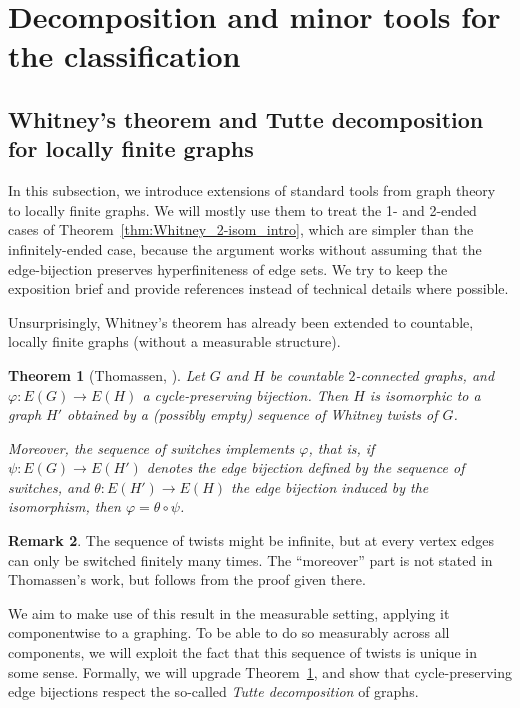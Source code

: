\documentclass{article}
\theoremstyle{plain}
\newtheorem{thm}{Theorem}[section]
\theoremstyle{definition}
\newtheorem{rem}[thm]{Remark}
\begin{document}
\section{Decomposition and minor tools for the classification} \label{sec:assembling_tools}

\subsection{Whitney's theorem and Tutte decomposition for locally finite graphs} \label{subsec:locally_finite_tools}

In this subsection, we introduce extensions of standard tools from graph theory to locally finite graphs. We will mostly use them to treat the 1- and 2-ended cases of Theorem~\ref{thm:Whitney_2-isom_intro}, which are simpler than the infinitely-ended case, because the argument works without assuming that the edge-bijection preserves hyperfiniteness of edge sets. We try to keep the exposition brief and provide references instead of technical details where possible.

Unsurprisingly, Whitney's theorem has already been extended to countable, locally finite graphs (without a measurable structure).

\begin{thm}[Thomassen, {\cite[Theorem 4.1]{thomassen1982duality}}] \label{thm:thomassen}
    Let $G$ and $H$ be countable $2$-connected graphs, and $\varphi:E(G) \to E(H)$ a cycle-preserving bijection. Then $H$ is isomorphic to a graph $H'$ obtained by a (possibly empty) sequence of Whitney twists of $G$. 
    
    Moreover, the sequence of switches implements $\varphi$, that is, if $\psi:E(G) \to E(H')$ denotes the edge bijection defined by the sequence of switches, and $\theta: E(H')\to E(H)$ the edge bijection induced by the isomorphism, then $\varphi=\theta \circ \psi$.
\end{thm}

\begin{rem}
    The sequence of twists might be infinite, but at every vertex edges can only be switched finitely many times. The ``moreover'' part is not stated in Thomassen's work, but follows from the proof given there.    
\end{rem}

We aim to make use of this result in the measurable setting, applying it componentwise to a graphing. To be able to do so measurably across all components, we will exploit the fact that this sequence of twists is unique in some sense. Formally, we will upgrade Theorem~\ref{thm:thomassen}, and show that cycle-preserving edge bijections respect the so-called \emph{Tutte decomposition} of graphs.
\end{document}
